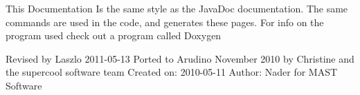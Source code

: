 \begin{DoxyParagraph}{\-This \-Documentation}
\-Is the same style as the \-Java\-Doc documentation. \-The same commands are used in the code, and generates these pages. \-For info on the program used check out a program called \-Doxygen
\end{DoxyParagraph}
\begin{DoxyParagraph}{\-Revised by \-Laszlo 2011-\/05-\/13}
\-Ported to \-Arudino \-November 2010 by \-Christine and the supercool software team \-Created on\-: 2010-\/05-\/11 \-Author\-: \-Nader for \-M\-A\-S\-T \-Software 
\end{DoxyParagraph}
